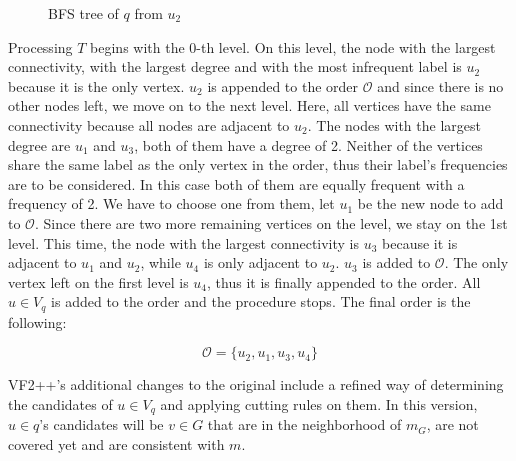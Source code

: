 \begin{example}
    \begin{figure}[h!]
        \centering
        \caption{BFS tree of $q$ from $u_2$}
        \label{fig:vf2pporderbfs}
    \end{figure}

    Processing $T$ begins with the 0-th level. On this level, the node with the largest connectivity,
    with the largest degree and with the most infrequent label is $u_2$ because it is the only vertex.
    $u_2$ is appended to the order $\mathcal{O}$ and since there is no other nodes left, we move on to
    the next level. Here, all vertices have the same connectivity because all nodes are adjacent to $u_2$.
    The nodes with the largest degree are $u_1$ and $u_3$, both of them have a degree of 2. Neither of
    the vertices share the same label as the only vertex in the order, thus their label's frequencies are    
    to be considered. In this case both of them are equally frequent with a frequency of 2. We have to
    choose one from them, let $u_1$ be the new node to add to $\mathcal{O}$. Since there are two more
    remaining vertices on the level, we stay on the 1st level. This time, the node with the largest
    connectivity is $u_3$ because it is adjacent to $u_1$ and $u_2$, while $u_4$ is only adjacent to $u_2$.
    $u_3$ is added to $\mathcal{O}$. The only vertex left on the first level is $u_4$, thus it is finally
    appended to the order. All $u \in V_q$ is added to the order and the procedure stops. The final order
    is the following:

    \[ \mathcal{O} = \{u_2, u_1, u_3, u_4\} \]

\end{example}





VF2++'s additional changes to the original include a refined way of determining the candidates
of $u \in V_q$ and applying cutting rules on them. In this version, $u \in q$'s candidates will be 
$v \in G$ that are in the neighborhood of $m_G$, are not covered yet and are consistent with $m$.

